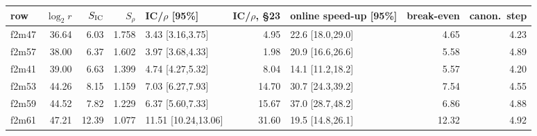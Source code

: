 \begin{tabular}{@{}lrrrlrlrr@{}}
\toprule
row & $\log_2 r$ & $S_{\rm IC}$ & $S_\rho$ & IC/$\rho$ [95\%] & IC/$\rho$, \S23 & online speed-up [95\%] & break-even & canon.\ step \\
\midrule
f2m47 & 36.64 & 6.03 & 1.758 & 3.43 [3.16,3.75] & 4.95 & 22.6 [18.0,29.0] & 4.65 & 4.23 \\
f2m57 & 38.00 & 6.37 & 1.602 & 3.97 [3.68,4.33] & 1.98 & 20.9 [16.6,26.6] & 5.58 & 4.89 \\
f2m41 & 39.00 & 6.63 & 1.399 & 4.74 [4.27,5.32] & 8.04 & 14.1 [11.2,18.2] & 5.57 & 4.20 \\
f2m53 & 44.26 & 8.15 & 1.159 & 7.03 [6.27,7.93] & 14.70 & 30.7 [24.3,39.2] & 7.54 & 4.55 \\
f2m59 & 44.52 & 7.82 & 1.229 & 6.37 [5.60,7.33] & 15.67 & 37.0 [28.7,48.2] & 6.86 & 4.88 \\
f2m61 & 47.21 & 12.39 & 1.077 & 11.51 [10.24,13.06] & 31.60 & 19.5 [14.8,26.1] & 12.32 & 4.92 \\
\bottomrule
\end{tabular}
